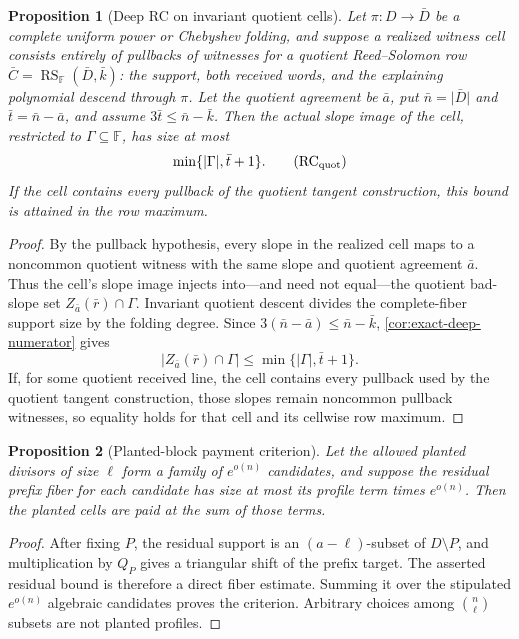 \documentclass[12pt,a4paper]{amsart}
\numberwithin{equation}{section}
\newtheorem{proposition}[proposition]{Proposition}
\theoremstyle{remark}
\DeclareMathOperator{\RS}{RS}
\newcommand{\F}{\mathbb F}
\newcommand{\abs}[1]{\lvert #1\rvert}
\begin{document}
\begin{proposition}[Deep RC on invariant quotient cells]
\label{prop:deep-invariant-quotient-ray}
Let \(\pi:D\to\bar D\) be a complete uniform power or Chebyshev folding,
and suppose a realized witness cell consists entirely of pullbacks of
witnesses for a quotient Reed--Solomon row
\(\bar C=\RS_\F(\bar D,\bar k)\): the support, both received words, and
the explaining polynomial descend through \(\pi\).  Let the quotient
agreement be \(\bar a\), put \(\bar n=\abs{\bar D}\) and
\(\bar t=\bar n-\bar a\), and assume
\(3\bar t\le\bar n-\bar k\).  Then the actual slope image of the cell,
restricted to \(\Gamma\subseteq\F\), has size at most
\[
                         \min\{\abs\Gamma,\bar t+1\}. \tag{RC$_{\rm quot}$}
\]
If the cell contains every pullback of the quotient tangent construction,
this bound is attained in the row maximum.
\end{proposition}

\begin{proof}
By the pullback hypothesis, every slope in the realized cell maps to a
noncommon quotient witness with the same slope and quotient agreement
\(\bar a\).  Thus the cell's slope image injects into---and need not
equal---the quotient bad-slope set \(Z_{\bar a}(\bar r)\cap\Gamma\).
Invariant quotient descent divides the complete-fiber support size by the
folding degree.  Since
\(3(\bar n-\bar a)\le\bar n-\bar k\),
\cref{cor:exact-deep-numerator} gives
\[
 \abs{Z_{\bar a}(\bar r)\cap\Gamma}
 \le\min\{\abs\Gamma,\bar t+1\}.
\]
If, for some quotient received line, the cell contains every pullback used
by the quotient tangent construction, those slopes remain noncommon
pullback witnesses, so equality holds for that cell and its cellwise row
maximum.
\end{proof}

\begin{proposition}[Planted-block payment criterion]\label{prop:planted-payment}
Let the allowed planted divisors of size \(\ell\) form a family of
\(e^{o(n)}\) candidates, and suppose the residual prefix fiber for each
candidate has size at most its profile term times \(e^{o(n)}\).  Then the
planted cells are paid at the sum of those terms.
\end{proposition}

\begin{proof}
After fixing \(P\), the residual support is an \((a-\ell)\)-subset of
\(D\setminus P\), and multiplication by \(Q_P\) gives a triangular shift
of the prefix target.  The asserted residual bound is therefore a direct
fiber estimate.  Summing it over the stipulated \(e^{o(n)}\) algebraic
candidates proves the criterion.  Arbitrary choices among
\(\binom n\ell\) subsets are not planted profiles.
\end{proof}
\end{document}
